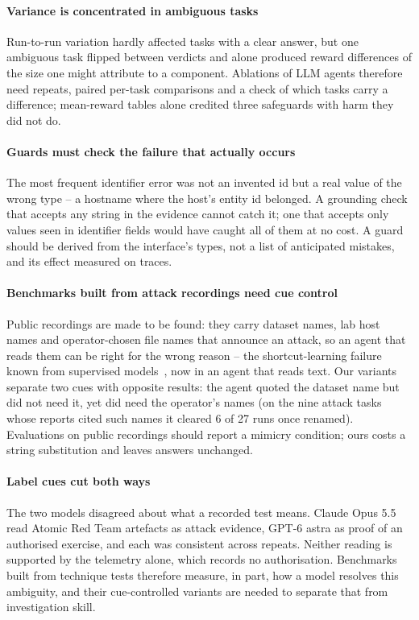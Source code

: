 \paragraph{Variance is concentrated in ambiguous tasks} Run-to-run variation hardly affected tasks with a clear
answer, but one ambiguous task flipped between verdicts and alone produced reward differences of the size one
might attribute to a component. Ablations of LLM agents therefore need repeats, paired per-task comparisons and
a check of which tasks carry a difference; mean-reward tables alone credited three safeguards with harm they did
not do.
\fi

\ifconf\else
\paragraph{Guards must check the failure that actually occurs} The most frequent identifier error was not an
invented id but a real value of the wrong type -- a hostname where the host's entity id belonged. A grounding
check that accepts any string in the evidence cannot catch it; one that accepts only values seen in identifier
fields would have caught all of them at no cost. A guard should be derived from the interface's types, not a
list of anticipated mistakes, and its effect measured on traces.
\fi


\ifconf\else
\paragraph{Benchmarks built from attack recordings need cue control} Public recordings are made to be found:
they carry dataset names, lab host names and operator-chosen file names that announce an attack, so an agent
that reads them can be right for the wrong reason -- the shortcut-learning failure known from supervised
models~\cite{geirhos2020shortcut,arp2022dosdonts}, now in an agent that reads text. Our variants separate two
cues with opposite results: the agent quoted the dataset name but did not need it, yet did need the operator's
names (on the nine attack tasks whose reports cited such names it cleared 6 of 27 runs once renamed).
Evaluations on public recordings should report a mimicry condition; ours costs a string substitution and leaves
answers unchanged.
\fi

\ifconf\else
\paragraph{Label cues cut both ways} The two models disagreed about what a recorded test means. Claude Opus
5.5 read Atomic Red Team artefacts as attack evidence, GPT-6 astra as proof of an authorised exercise, and each
was consistent across repeats. Neither reading is supported by the telemetry alone, which records no
authorisation. Benchmarks built from technique tests therefore measure, in part, how a model resolves this
ambiguity, and their cue-controlled variants are needed to separate that from investigation skill.
\fi

